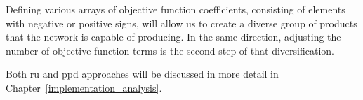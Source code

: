 Defining various arrays of objective function coefficients, consisting of elements with negative or positive signs, will allow us to create a diverse group of products that the network is capable of producing. In the same direction, adjusting the number of objective function terms is the second step of that diversification.

Both \acf{ru} and \acf{ppd} approaches will be discussed in more detail in Chapter~\ref{implementation_analysis}.
